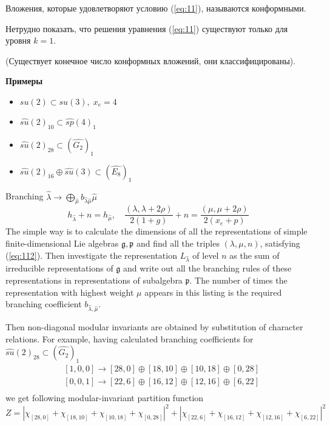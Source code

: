 \documentclass[a4paper,12pt]{article}
\theoremstyle{definition} \newtheorem{Def}{Definition}
\begin{document}
Вложения, которые удовлетворяют условию (\ref{eq:11}), называются конформными.

Нетрудно показать, что решения уравнения (\ref{eq:11}) существуют только для уровня $k=1$.

(Существует конечное число конформных вложений, они классифицированы).

{\bf Примеры}
\begin{itemize}
\item $su(2)\subset su(3),\; x_e=4$
\item $\hat{su}(2)_{10}\subset\hat{sp}(4)_1$
\item $\hat{su}(2)_{28}\subset(\hat{G_2})_1$
\item $\hat{su}(2)_{16}\oplus\hat{su}(3)\subset (\hat{E_8})_1$
\end{itemize}

Branching $\hat{\lambda}\to \bigoplus_{\hat{\mu}}b_{\hat{\lambda}\hat{\mu}}\hat{\mu}$
\begin{equation}
  \label{eq:112}
  h_{\hat{\lambda}}+n=h_{\hat{\mu}},\quad \frac{(\lambda,\lambda+2\rho)}{2(1+g)}+n=\frac{(\mu,\mu+2\rho)}{2(x_e+p)}
\end{equation}
The simple way is to calculate the dimensions of all the representations of simple finite-dimensional Lie algebras $\mathfrak{g},\mathfrak{p}$ and find all the triples $(\lambda,\mu,n)$, satisfying (\ref{eq:112}). Then investigate the representation $L_{\hat{\lambda}}$ of level $n$ as the sum of irreducible representations of $\mathfrak{g}$ and write out all the branching rules of these representations in representations of subalgebra $\mathfrak{p}$. The number of times the representation with highest weight $\mu$ appears in this listing is the required branching coefficient $b_{\hat{\lambda},\hat{\mu}}$.

  Then non-diagonal modular invariants are obtained by substitution of character relations. For example, having calculated branching coefficients for $\hat{su}(2)_{28}\subset (\hat{G_2})_1$
  \begin{equation}
    \label{eq:113}
    \begin{aligned}
      & [1,0,0]\to [28,0]\oplus [18,10]\oplus [10,18]\oplus [0,28]\\
      & [0,0,1]\to [22,6]\oplus [16,12]\oplus [12,16]\oplus [6,22]\\
    \end{aligned}
  \end{equation}
we get following modular-invariant partition function
\begin{equation}
  \label{eq:114}
  Z=\left|\chi_{[28,0]}+\chi_{[18,10]}+\chi_{[10,18]}+\chi_{[0,28]}\right|^2+\left|\chi_{[22,6]}+\chi_{[16,12]}+\chi_{[12,16]}+\chi_{[6,22]}\right|^2
\end{equation}

{}

\end{document}
